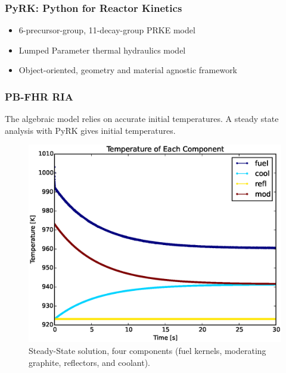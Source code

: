 
\begin{frame}[fragile]
  \frametitle{PyRK: Python for Reactor Kinetics}
  \begin{itemize}
    \item 6-precursor-group, 11-decay-group PRKE model
    \item Lumped Parameter thermal hydraulics model
    \item Object-oriented, geometry and material agnostic framework
  \end{itemize}
\end{frame}


\begin{frame}[fragile]
  \frametitle{PB-FHR RIA}
The algebraic model relies on accurate initial temperatures.
A steady state analysis with PyRK gives initial temperatures.
  \begin{figure}[htbp!]
    \begin{center}
      \includegraphics[height=0.7\textheight]{./progress/ss_w_o_feedbacks.eps}
    \end{center}
    \caption{Steady-State solution, four components (fuel kernels, moderating
    graphite, reflectors, and coolant).}
    \label{fig:ss_w_o_feedbacks}
  \end{figure}
\end{frame}

